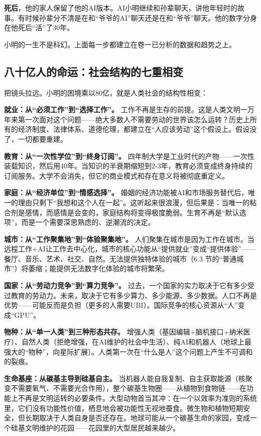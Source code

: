 \documentclass[11pt,a4paper]{ctexart}
\begin{document}
\textbf{死后}，他的家人保留了他的AI版本。AI小明继续和孙辈聊天，讲他年轻时的故事。有时候孙辈分不清是在和“爷爷的AI”聊天还是在和“爷爷”聊天。他的数字分身在他死后“活”了30年。

小明的一生不是科幻。上面每一步都建立在卷一已分析的数据和趋势之上。

\subsection{八十亿人的命运：社会结构的七重相变}

把镜头拉远。小明的困境乘以80亿，就是人类社会的结构性相变：

\textbf{就业：从“必须工作”到“选择工作”。} 工作不再是生存的前提。这是人类文明一万年来第一次面对这个问题——绝大多数人不需要劳动的世界该怎么运转？历史上所有的经济制度、法律体系、道德伦理，都建立在“人应该劳动”这个假设上。假设没了，一切都要重建。

\textbf{教育：从“一次性学位”到“终身订阅”。} 四年制大学是工业时代的产物——一次性装载知识，然后用40年。当知识的半衰期缩短到2-3年，教育必须变成终身持续的订阅服务。大学不会消失，但它的商业模式和存在意义将被彻底重定义。

\textbf{家庭：从“经济单位”到“情感选择”。} 婚姻的经济功能被AI和市场服务替代后，唯一的理由只剩下“我想和这个人在一起”。这听起来很浪漫，但后果是：当唯一的粘合剂是感情，而感情是会变的，家庭结构将变得极度脆弱。生育不再是“默认选项”，而是一个需要深思熟虑的、逆潮流的决定。

\textbf{城市：从“工作聚集地”到“体验聚集地”。} 人们聚集在城市是因为工作在城市。当远程工作+AI让工作去中心化，城市的核心功能从“提供就业”变成“提供体验”——餐厅、音乐、艺术、社交、自然。无法提供独特体验的城市（6.3 节的“普通城市”）将萎缩；能提供无法数字化体验的城市将繁荣。

\textbf{国家：从“劳动力竞争”到“算力竞争”。} 过去，一个国家的实力取决于它有多少受过教育的劳动力。未来，取决于它有多少算力、多少能源、多少数据。人口不再是优势——可能反而是负担（更多的人需要UBI）。国际竞争的核心资源从“人”变成“GPU”。

\textbf{物种：从“单一人类”到三种形态共存。} 增强人类（基因编辑+脑机接口+纳米医疗）、自然人类（拒绝增强，在AI维护的社会中生活）、纯AI和机器人（地球上最强大的“物种”，向星际扩展）。人类第一次在“什么是人”这个问题上产生不可调和的裂痕。

\textbf{生命基座：从碳基主导到硅基自主。} 当机器人能自我复制、自主获取能源（核聚变不需要氧气、不需要光合作用），整个碳基生物圈——从植物到食物链——在功能上不再是文明运转的必要条件。大型动物首当其冲：在一个以效率为准则的系统里，它们没有功能性价值，栖息地会被功能性无视地蚕食。微生物和植物短期安全，但长期取决于人类自身是否还存在。地球可能从一个碳基生命的家园，变成一个硅基文明维护的花园——花园里的大型居民越来越少。
\end{document}
